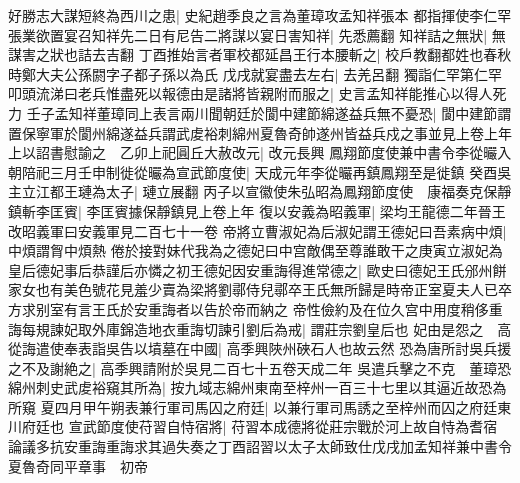 好勝志大謀短終為西川之患|{
	史紀趙季良之言為董璋攻孟知祥張本}
都指揮使李仁罕張業欲置宴召知祥先二日有尼告二將謀以宴日害知祥|{
	先悉薦翻}
知祥詰之無狀|{
	無謀害之狀也詰去吉翻}
丁酉推始言者軍校都延昌王行本腰斬之|{
	校戶教翻都姓也春秋時鄭大夫公孫閼字子都子孫以為氏}
戊戌就宴盡去左右|{
	去羌呂翻}
獨詣仁罕第仁罕叩頭流涕曰老兵惟盡死以報德由是諸將皆親附而服之|{
	史言孟知祥能推心以得人死力}
壬子孟知祥董璋同上表言兩川聞朝廷於閬中建節綿遂益兵無不憂恐|{
	閬中建節謂置保寧軍於閬州綿遂益兵謂武䖍裕刺綿州夏魯奇帥遂州皆益兵戍之事並見上卷上年}
上以詔書慰諭之　乙卯上祀圓丘大赦改元|{
	改元長興}
鳳翔節度使兼中書令李從曮入朝陪祀三月壬申制徙從曮為宣武節度使|{
	天成元年李從曮再鎮鳳翔至是徙鎮}
癸酉吳主立江都王璉為太子|{
	璉立展翻}
丙子以宣徽使朱弘昭為鳳翔節度使　康福奏克保靜鎮斬李匡賓|{
	李匡賓據保靜鎮見上卷上年}
復以安義為昭義軍|{
	梁均王龍德二年晉王改昭義軍曰安義軍見二百七十一卷}
帝將立曹淑妃為后淑妃謂王德妃曰吾素病中煩|{
	中煩謂胷中煩熱}
倦於接對妹代我為之德妃曰中宫敵偶至尊誰敢干之庚寅立淑妃為皇后德妃事后恭謹后亦憐之初王德妃因安重誨得進常德之|{
	歐史曰德妃王氏邠州餅家女也有美色號花見羞少賣為梁將劉鄩侍兒鄩卒王氏無所歸是時帝正室夏夫人已卒方求别室有言王氏於安重誨者以告於帝而納之}
帝性儉約及在位久宫中用度稍侈重誨每規諫妃取外庫錦造地衣重誨切諫引劉后為戒|{
	謂莊宗劉皇后也}
妃由是怨之　高從誨遣使奉表詣吳告以墳墓在中國|{
	高季興陜州硤石人也故云然}
恐為唐所討吳兵援之不及謝絶之|{
	高季興請附於吳見二百七十五卷天成二年}
吳遣兵擊之不克　董璋恐綿州刺史武䖍裕窺其所為|{
	按九域志綿州東南至梓州一百三十七里以其逼近故恐為所窺}
夏四月甲午朔表兼行軍司馬囚之府廷|{
	以兼行軍司馬誘之至梓州而囚之府廷東川府廷也}
宣武節度使苻習自恃宿將|{
	苻習本成德將從莊宗戰於河上故自恃為耆宿}
論議多抗安重誨重誨求其過失奏之丁酉詔習以太子太師致仕戊戌加孟知祥兼中書令夏魯奇同平章事　初帝

